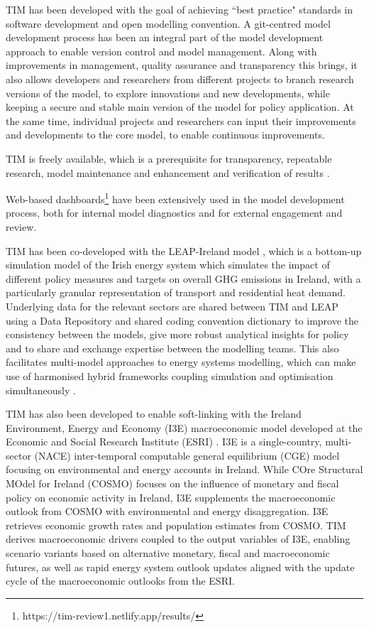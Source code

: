 \documentclass[gmd,manuscript]{copernicus}
\begin{document}

TIM has been developed with the goal of achieving ``best practice" standards in software development and open modelling convention. A git-centred model development process has been an integral part of the model development approach to enable version control and model management. Along with improvements in management, quality assurance and transparency this brings, it also allows developers and researchers from different projects to branch research versions of the model, to explore innovations and new developments, while keeping a secure and stable main version of the model for policy application. At the same time, individual projects and researchers can input their improvements and developments to the core model, to enable continuous improvements. 

TIM is freely available, which is a prerequisite for transparency, repeatable research, model maintenance and enhancement and verification of results \citep{Pfenninger2018}. 

Web-based dashboards\footnote{https://tim-review1.netlify.app/results/} have been extensively used in the model development process, both for internal model diagnostics and for external engagement and review. 

TIM has been co-developed with the LEAP-Ireland model \citep{MacUidhir2020}, which is a bottom-up simulation model of the Irish energy system which simulates the impact of different policy measures and targets on overall GHG emissions in Ireland, with a particularly granular representation of transport and residential heat demand. Underlying data for the relevant sectors are shared between TIM and LEAP using a Data Repository and shared coding convention dictionary to improve the consistency between the models, give more robust analytical insights for policy and to share and exchange expertise between the modelling teams. This also facilitates multi-model approaches to energy systems modelling, which can make use of harmonised hybrid frameworks coupling simulation and optimisation simultaneously \citep{rogan2014leaps}.

TIM has also been developed to enable soft-linking with the Ireland Environment, Energy and Economy (I3E) macroeconomic model developed at the Economic and Social Research Institute (ESRI) \citep{Yakut2020}. I3E is a single-country, multi-sector (NACE) inter-temporal computable general equilibrium (CGE) model focusing on environmental and energy accounts in Ireland. While COre Structural MOdel for Ireland (COSMO) focuses on the influence of monetary and fiscal policy on economic activity in Ireland, I3E supplements the macroeconomic outlook from COSMO with environmental and energy disaggregation. I3E retrieves economic growth rates and population estimates from COSMO. TIM derives macroeconomic drivers coupled to the output variables of I3E, enabling scenario variants based on alternative monetary, fiscal and macroeconomic futures, as well as rapid energy system outlook updates aligned with the update cycle of the macroeconomic outlooks from the ESRI.
\end{document}
